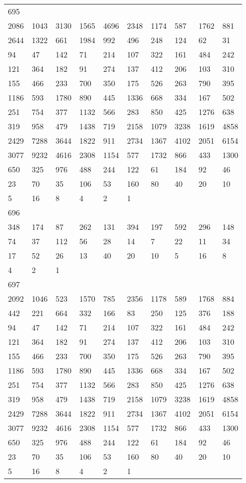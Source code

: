 \begin{longtable}{*{10}{l}}
695&&&&&&&&&\\
2086& 1043& 3130& 1565& 4696& 2348& 1174& 587& 1762& 881\\
2644& 1322& 661& 1984& 992& 496& 248& 124& 62& 31\\
94& 47& 142& 71& 214& 107& 322& 161& 484& 242\\
121& 364& 182& 91& 274& 137& 412& 206& 103& 310\\
155& 466& 233& 700& 350& 175& 526& 263& 790& 395\\
1186& 593& 1780& 890& 445& 1336& 668& 334& 167& 502\\
251& 754& 377& 1132& 566& 283& 850& 425& 1276& 638\\
319& 958& 479& 1438& 719& 2158& 1079& 3238& 1619& 4858\\
2429& 7288& 3644& 1822& 911& 2734& 1367& 4102& 2051& 6154\\
3077& 9232& 4616& 2308& 1154& 577& 1732& 866& 433& 1300\\
650& 325& 976& 488& 244& 122& 61& 184& 92& 46\\
23& 70& 35& 106& 53& 160& 80& 40& 20& 10\\
5& 16& 8& 4& 2& 1& \\

696&&&&&&&&&\\
348& 174& 87& 262& 131& 394& 197& 592& 296& 148\\
74& 37& 112& 56& 28& 14& 7& 22& 11& 34\\
17& 52& 26& 13& 40& 20& 10& 5& 16& 8\\
4& 2& 1& \\

697&&&&&&&&&\\
2092& 1046& 523& 1570& 785& 2356& 1178& 589& 1768& 884\\
442& 221& 664& 332& 166& 83& 250& 125& 376& 188\\
94& 47& 142& 71& 214& 107& 322& 161& 484& 242\\
121& 364& 182& 91& 274& 137& 412& 206& 103& 310\\
155& 466& 233& 700& 350& 175& 526& 263& 790& 395\\
1186& 593& 1780& 890& 445& 1336& 668& 334& 167& 502\\
251& 754& 377& 1132& 566& 283& 850& 425& 1276& 638\\
319& 958& 479& 1438& 719& 2158& 1079& 3238& 1619& 4858\\
2429& 7288& 3644& 1822& 911& 2734& 1367& 4102& 2051& 6154\\
3077& 9232& 4616& 2308& 1154& 577& 1732& 866& 433& 1300\\
650& 325& 976& 488& 244& 122& 61& 184& 92& 46\\
23& 70& 35& 106& 53& 160& 80& 40& 20& 10\\
5& 16& 8& 4& 2& 1& \\


\end{longtable}
